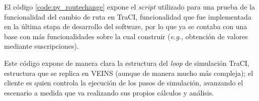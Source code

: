 El código \ref{code:py_routechange} expone el \emph{script} utilizado para una prueba de la funcionalidad del cambio de ruta en TraCI, funcionalidad que fue implementada en la última etapa de desarrollo del software, por lo que ya se contaba con una base con más funcionalidades sobre la cual construir (\emph{e.g.}, obtención de valores mediante suscripciones).

Este código expone de manera clara la estructura del \emph{loop} de simulación TraCI, estructura que se replica en VEINS (aunque de manera mucho más compleja); el cliente es quien controla la ejecución de los pasos de simulación, avanzando el escenario a medida que va realizando sus propios cálculos y análisis.

